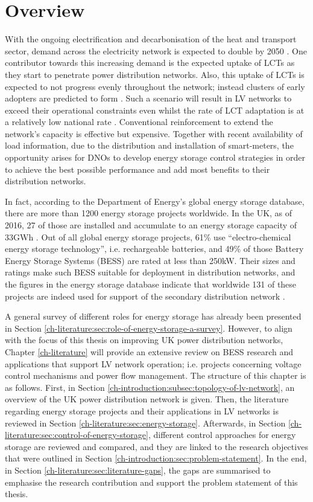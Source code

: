 \section{Overview}
\label{ch-literature:sec:overview}

With the ongoing electrification and decarbonisation of the heat and transport sector, demand across the electricity network is expected to double by 2050 \cite{Wilks2010}.
One contributor towards this increasing demand is the expected uptake of LCTs as they start to penetrate power distribution networks.
Also, this uptake of LCTs is expected to not progress evenly throughout the network; instead clusters of early adopters are predicted to form \cite{Poghosyan2014}.
Such a scenario will result in LV networks to exceed their operational constraints even whilst the rate of LCT adaptation is at a relatively low national rate \cite{Poghosyan2014}.
Conventional reinforcement to extend the network's capacity is effective but expensive.
Together with recent availability of load information, due to the distribution and installation of smart-meters, the opportunity arises for DNOs to develop energy storage control strategies in order to achieve the best possible performance and add most benefits to their distribution networks.

In fact, according to the Department of Energy's global energy storage database, there are more than 1200 energy storage projects worldwide.
In the UK, as of 2016, 27 of those are installed and accumulate to an energy storage capacity of 33GWh \cite{Garton2016}.
Out of all global energy storage projects, 61\% use ``electro-chemical energy storage technology'', i.e. rechargeable batteries, and 49\% of those Battery Energy Storage Systems (BESS) are rated at less than 250kW.
Their sizes and ratings make such BESS suitable for deployment in distribution networks, and the figures in the energy storage database indicate that worldwide 131 of these projects are indeed used for support of the secondary distribution network \cite{DOE-GESD}.

A general survey of different roles for energy storage has already been presented in Section \ref{ch-literature:sec:role-of-energy-storage-a-survey}.
However, to align with the focus of this thesis on improving UK power distribution networks, Chapter \ref{ch-literature} will provide an extensive review on BESS research and applications that support LV network operation; i.e. projects concerning voltage control mechanisms and power flow management.
The structure of this chapter is as follows.
First, in Section \ref{ch-introduction:subsec:topology-of-lv-network}, an overview of the UK power distribution network is given.
Then, the literature regarding energy storage projects and their applications in LV networks is reviewed in Section \ref{ch-literature:sec:energy-storage}.
Afterwards, in Section \ref{ch-literature:sec:control-of-energy-storage}, different control approaches for energy storage are reviewed and compared, and they are linked to the research objectives that were outlined in Section \ref{ch-introduction:sec:problem-statement}.
In the end, in Section \ref{ch-literature:sec:literature-gaps}, the gaps are summarised to emphasise the research contribution and support the problem statement of this thesis.
